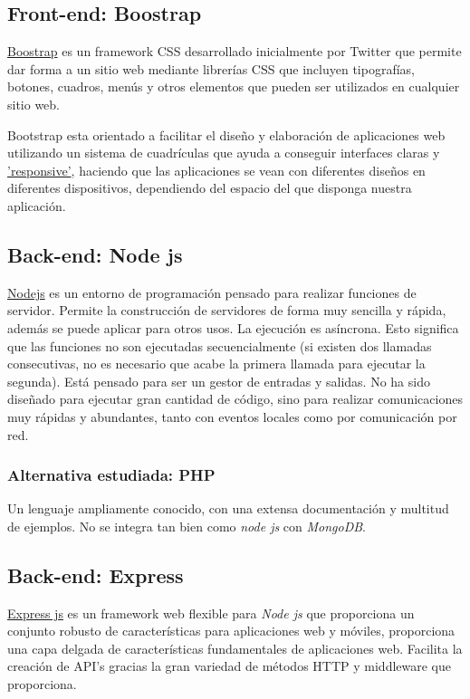 \subsection{Front-end: Boostrap}\label{tecnologias-boostrap}
\hyperlink{https://www.getbootstrap.com/}{Boostrap} es un framework CSS desarrollado inicialmente  por Twitter que permite dar forma a un sitio web mediante librerías CSS que incluyen tipografías, botones, cuadros, menús y otros elementos que pueden ser utilizados en cualquier sitio web.

Bootstrap esta orientado a facilitar el diseño y elaboración de aplicaciones web utilizando un sistema de cuadrículas que ayuda a conseguir interfaces claras y  \hyperlink{https://es.wikipedia.org/wiki/Diseño_web_adaptable}{'responsive'}, haciendo que las aplicaciones se vean con diferentes diseños en diferentes dispositivos, dependiendo del espacio del que disponga nuestra aplicación.


\subsection{Back-end: Node js}\label{tecnologias-nodejs}
\hyperlink{https://nodejs.org/}{Nodejs} es un entorno de programación pensado para realizar funciones de servidor. Permite la construcción de servidores de forma muy sencilla y rápida, además se puede aplicar para otros usos. La ejecución es asíncrona. Esto significa que las funciones no son ejecutadas secuencialmente (si existen dos llamadas consecutivas, no es necesario que acabe la primera llamada para ejecutar la segunda).
Está pensado para ser un gestor de entradas y salidas. No ha sido diseñado para ejecutar gran cantidad de código, sino para realizar comunicaciones muy rápidas y abundantes, tanto con eventos locales como por comunicación por red.


\subsubsection{Alternativa estudiada: PHP}\label{php}
Un lenguaje ampliamente conocido, con una extensa documentación y multitud de ejemplos. No se integra tan bien como \emph{node js} con \emph{MongoDB}. 



\subsection{Back-end: Express }\label{tecnologias-expressjs}
\hyperlink{http://expressjs.com/}{Express js} es un framework web flexible para \emph{Node js} que proporciona un conjunto robusto de características para aplicaciones web y móviles, proporciona una capa delgada de características fundamentales de aplicaciones web. Facilita la creación de API’s gracias la gran variedad de métodos HTTP y middleware que proporciona.


